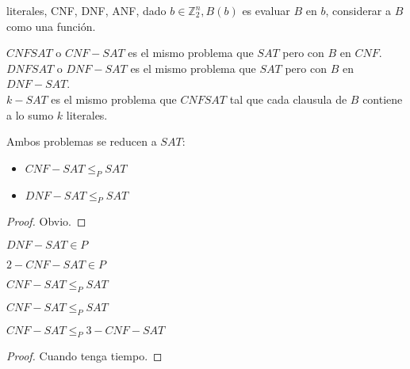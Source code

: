 \begin{definition}
literales, CNF, DNF, ANF, dado $b \in \mathbb{Z}_2^n, B(b)$ es evaluar $B$ en $b$, considerar a $B$ como una función.
\end{definition}
\begin{definition}
$CNFSAT$ o $CNF-SAT$ es el mismo problema que $SAT$ pero con $B$ en $CNF$.\\
$DNFSAT$ o $DNF-SAT$ es el mismo problema que $SAT$ pero con $B$ en $DNF-SAT$.\\
$k-SAT$ es el mismo problema que $CNFSAT$ tal que cada clausula de $B$ contiene a lo sumo $k$ literales.
\end{definition}
\begin{proposition}
Ambos problemas se reducen a $SAT$:
\begin{itemize}
    \item $CNF-SAT \le_{P} SAT$
    \item $DNF-SAT \le_{P} SAT$
\end{itemize}
\end{proposition}
\begin{proof}
Obvio.
\end{proof}

\begin{theorem}
$DNF-SAT \in P$
\end{theorem}

\begin{theorem}
$2-CNF-SAT \in P$
\end{theorem}

\begin{theorem}
$CNF-SAT \le_P SAT$
\end{theorem}

\begin{theorem}
$CNF-SAT \le_P SAT$
\end{theorem}

\begin{theorem}
$CNF-SAT \le_P 3-CNF-SAT$
\end{theorem}
\begin{proof}
Cuando tenga tiempo.
\end{proof}

